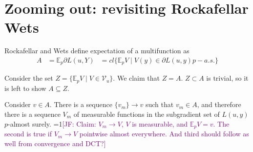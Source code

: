 \documentclass{article}
\newcommand{\Comments}{1}
\newcommand{\mynote}[2]{\ifnum\Comments=1\textcolor{#1}{#2}\fi}
\newcommand{\jessie}[1]{\mynote{purple}{[JF: #1]}}
\newcommand{\E}{\mathbb{E}}
\renewcommand{\P}{\mathcal{P}}
\newcommand{\V}{\mathcal{V}}
\newcommand{\Y}{\mathcal{Y}}
\begin{document}
\section{Zooming out: revisiting Rockafellar Wets}
Rockafellar and Wets define expectation of a multifunction as 
\begin{align*}
A &= \E_p \partial L(u,Y) &= cl\{\E_p V \mid V(y) \in \partial L(u,y) p-a.s. \}
\end{align*}
%
%
%
%

Consider the set $Z = \{\E_p V \mid V \in \V_u\}$.
We claim that $Z = A$.
$Z \subset A$ is trivial, so it is left to show $A \subseteq Z$.

Consider $v \in A$.
There is a sequence $\{v_m\} \to v$ such that $v_m \in A$, and therefore there is a sequence $V_m$ of measurable functions in the subgradient set of $L(u,y)$ $p$-almost surely.
\jessie{Claim: $V_m \to V$, $V$ is measurable, and $\E_p V = v$.  The second is true if $V_m \to V$ pointwise almost everywhere. And third should follow as well from convergence and DCT?}
\end{document}
